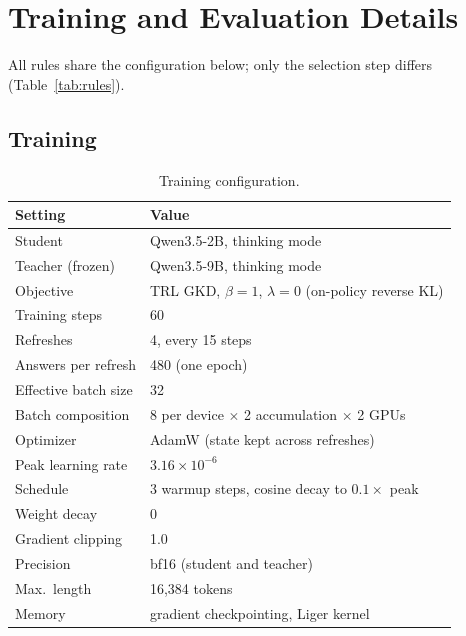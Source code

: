 \documentclass[11pt]{article}
\begin{document}


\appendix
\raggedbottom
\setlength{\intextsep}{8pt plus 2pt minus 2pt}

\section{Training and Evaluation Details}
\label{app:config}

All rules share the configuration below; only the selection step differs (Table~\ref{tab:rules}).

\subsection{Training}

\begin{table}[H]
\centering
\small
\begin{tabular}{@{}P{2.6cm}P{4.4cm}@{}}
\toprule
\textbf{Setting} & \textbf{Value} \\
\midrule
Student & Qwen3.5-2B, thinking mode \\
Teacher (frozen) & Qwen3.5-9B, thinking mode \\
Objective & TRL GKD, $\beta = 1$, $\lambda = 0$ (on-policy reverse KL) \\
Training steps & 60 \\
Refreshes & 4, every 15 steps \\
Answers per refresh & 480 (one epoch) \\
Effective batch size & 32 \\
Batch composition & 8 per device $\times$ 2 accumulation $\times$ 2 GPUs \\
Optimizer & AdamW (state kept across refreshes) \\
Peak learning rate & $3.16 \times 10^{-6}$ \\
Schedule & 3 warmup steps, cosine decay to $0.1 \times$ peak \\
Weight decay & 0 \\
Gradient clipping & 1.0 \\
Precision & bf16 (student and teacher) \\
Max.\ length & 16,384 tokens \\
Memory & gradient checkpointing, Liger kernel \\
\bottomrule
\end{tabular}
\caption{Training configuration.}
\label{tab:config}
\end{table}
\end{document}
